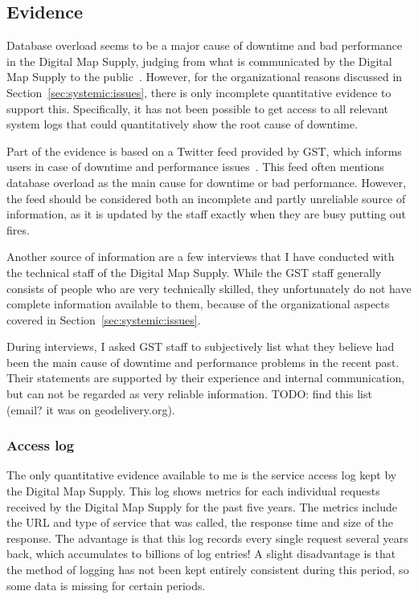 \subsection{Evidence}
Database overload seems to be a major cause of downtime and bad performance in the Digital Map Supply, judging from what is communicated by the Digital Map Supply to the public~\cite{twitterfeed}. However, for the organizational reasons discussed in Section~\ref{sec:systemic:issues}, there is only incomplete quantitative evidence to support this. Specifically, it has not been possible to get access to all relevant system logs that could quantitatively show the root cause of downtime.

Part of the evidence is based on a Twitter feed provided by GST, which informs users in case of downtime and performance issues~\cite{twitterfeed}. This feed often mentions database overload as the main cause for downtime or bad performance. However, the feed should be considered both an incomplete and partly unreliable source of information, as it is updated by the staff exactly when they are busy putting out fires. 

Another source of information are a few interviews that I have conducted with the technical staff of the Digital Map Supply. While the GST staff generally consists of people who are very technically skilled, they unfortunately do not have complete information available to them, because of the organizational aspects covered in Section~\ref{sec:systemic:issues}.

During interviews, I asked GST staff to subjectively list what they believe had been the main cause of downtime and performance problems in the recent past. Their statements are supported by their experience and internal communication, but can not be regarded as very reliable information. TODO: find this list (email? it was on geodelivery.org).

\subsubsection{Access log}
The only quantitative evidence available to me is the service access log kept by the Digital Map Supply. This log shows metrics for each individual requests received by the Digital Map Supply for the past five years. The metrics include the URL and type of service that was called, the response time and size of the response. The advantage is that this log records every single request several years back, which accumulates to billions of log entries! A slight disadvantage is that the method of logging has not been kept entirely consistent during this period, so some data is missing for certain periods.

